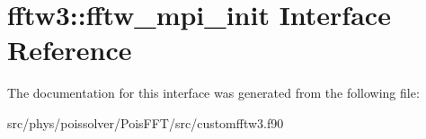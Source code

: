\hypertarget{interfacefftw3_1_1fftw__mpi__init}{}\section{fftw3\+:\+:fftw\+\_\+mpi\+\_\+init Interface Reference}
\label{interfacefftw3_1_1fftw__mpi__init}


The documentation for this interface was generated from the following file\+:\begin{DoxyCompactItemize}
\item 
src/phys/poissolver/\+Pois\+F\+F\+T/src/customfftw3.\+f90\end{DoxyCompactItemize}
